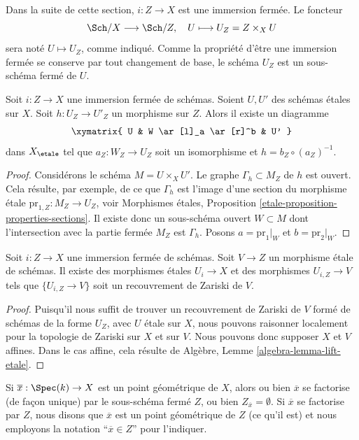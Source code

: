 \medskip\noindent
Dans la suite de cette section, $i : Z \to X$ est une immersion ferm\'ee.
Le foncteur
$$
\Sch/X \longrightarrow \Sch/Z, \quad
U \longmapsto U_Z = Z \times_X U
$$
sera not\'e $U \mapsto U_Z$, comme indiqu\'e. Comme la propri\'et\'e d'\^etre une immersion ferm\'ee
se conserve par tout changement de base, le sch\'ema $U_Z$ est un sous-sch\'ema ferm\'e
de $U$.

\begin{lemma}
\label{lemma-closed-immersion-almost-full}
Soit $i : Z \to X$ une immersion ferm\'ee de sch\'emas.
Soient $U, U'$ des sch\'emas \'etales sur $X$. Soit $h : U_Z \to U'_Z$
un morphisme sur $Z$. Alors il existe un diagramme
$$
\xymatrix{
U & W \ar[l]_a \ar[r]^b & U'
}
$$
dans $X_\etale$ tel que $a_Z : W_Z \to U_Z$
soit un isomorphisme et $h = b_Z \circ (a_Z)^{-1}$.
\end{lemma}

\begin{proof}
Consid\'erons le sch\'ema $M = U \times_X U'$. Le graphe $\Gamma_h \subset M_Z$
de $h$ est ouvert. Cela r\'esulte, par exemple, de ce que $\Gamma_h$ est l'image d'une
section du morphisme \'etale $\text{pr}_{1, Z} : M_Z \to U_Z$, voir
Morphismes étales, Proposition \ref{etale-proposition-properties-sections}.
Il existe donc un sous-sch\'ema ouvert $W \subset M$ dont l'intersection avec
la partie ferm\'ee $M_Z$ est $\Gamma_h$. Posons $a = \text{pr}_1|_W$
et $b = \text{pr}_2|_W$.
\end{proof}

\begin{lemma}
\label{lemma-closed-immersion-almost-essentially-surjective}
Soit $i : Z \to X$ une immersion ferm\'ee de sch\'emas.
Soit $V \to Z$ un morphisme \'etale de sch\'emas.
Il existe des morphismes \'etales $U_i \to X$ et des morphismes
$U_{i, Z} \to V$ tels que $\{U_{i, Z} \to V\}$
soit un recouvrement de Zariski de $V$.
\end{lemma}

\begin{proof}
Puisqu'il nous suffit de trouver un recouvrement de Zariski de $V$ form\'e de sch\'emas
de la forme $U_Z$, avec $U$ \'etale sur $X$, nous pouvons raisonner localement pour la topologie de Zariski sur $X$
et sur $V$. Nous pouvons donc supposer $X$ et $V$ affines. Dans le cas affine, cela r\'esulte de
Algèbre, Lemme \ref{algebra-lemma-lift-etale}.
\end{proof}

\noindent
Si $\overline{x} : \Spec(k) \to X$ est un point g\'eom\'etrique de $X$, alors
ou bien $\overline{x}$ se factorise (de fa\c{c}on unique) par le sous-sch\'ema ferm\'e $Z$, ou bien
$Z_{\overline{x}} = \emptyset$. Si $\overline{x}$ se factorise par $Z$,
nous disons que $\overline{x}$ est un point g\'eom\'etrique de $Z$ (ce qu'il est) et
nous employons la notation ``$\overline{x} \in Z$'' pour l'indiquer.

